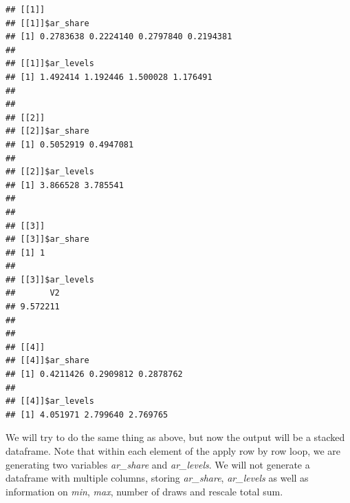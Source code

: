 \documentclass[
]{book}
\begin{document}
\begin{verbatim}
## [[1]]
## [[1]]$ar_share
## [1] 0.2783638 0.2224140 0.2797840 0.2194381
## 
## [[1]]$ar_levels
## [1] 1.492414 1.192446 1.500028 1.176491
## 
## 
## [[2]]
## [[2]]$ar_share
## [1] 0.5052919 0.4947081
## 
## [[2]]$ar_levels
## [1] 3.866528 3.785541
## 
## 
## [[3]]
## [[3]]$ar_share
## [1] 1
## 
## [[3]]$ar_levels
##       V2 
## 9.572211 
## 
## 
## [[4]]
## [[4]]$ar_share
## [1] 0.4211426 0.2909812 0.2878762
## 
## [[4]]$ar_levels
## [1] 4.051971 2.799640 2.769765
\end{verbatim}

We will try to do the same thing as above, but now the output will be a stacked dataframe. Note that within each element of the apply row by row loop, we are generating two variables \emph{ar\_share} and \emph{ar\_levels}. We will not generate a dataframe with multiple columns, storing \emph{ar\_share}, \emph{ar\_levels} as well as information on \emph{min}, \emph{max}, number of draws and rescale total sum.
\end{document}
